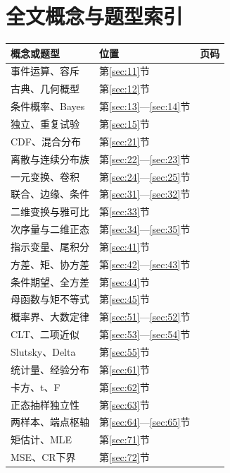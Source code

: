 \section{全文概念与题型索引}
\begin{longtable}{@{}p{}p{}p{}@{}}\toprule
概念或题型&位置&页码\\\midrule\endhead
事件运算、容斥&第\ref{sec:11}节&\pageref{sec:11}\\
古典、几何概型&第\ref{sec:12}节&\pageref{sec:12}\\
条件概率、Bayes&第\ref{sec:13}—\ref{sec:14}节&\pageref{sec:13}\\
独立、重复试验&第\ref{sec:15}节&\pageref{sec:15}\\
CDF、混合分布&第\ref{sec:21}节&\pageref{sec:21}\\
离散与连续分布族&第\ref{sec:22}—\ref{sec:23}节&\pageref{sec:22}\\
一元变换、卷积&第\ref{sec:24}—\ref{sec:25}节&\pageref{sec:24}\\
联合、边缘、条件&第\ref{sec:31}—\ref{sec:32}节&\pageref{sec:31}\\
二维变换与雅可比&第\ref{sec:33}节&\pageref{sec:33}\\
次序量与二维正态&第\ref{sec:34}—\ref{sec:35}节&\pageref{sec:34}\\
指示变量、尾积分&第\ref{sec:41}节&\pageref{sec:41}\\
方差、矩、协方差&第\ref{sec:42}—\ref{sec:43}节&\pageref{sec:42}\\
条件期望、全方差&第\ref{sec:44}节&\pageref{sec:44}\\
母函数与矩不等式&第\ref{sec:45}节&\pageref{sec:45}\\
概率界、大数定律&第\ref{sec:51}—\ref{sec:52}节&\pageref{sec:51}\\
CLT、二项近似&第\ref{sec:53}—\ref{sec:54}节&\pageref{sec:53}\\
Slutsky、Delta&第\ref{sec:55}节&\pageref{sec:55}\\
统计量、经验分布&第\ref{sec:61}节&\pageref{sec:61}\\
卡方、t、F&第\ref{sec:62}节&\pageref{sec:62}\\
正态抽样独立性&第\ref{sec:63}节&\pageref{sec:63}\\
两样本、端点枢轴&第\ref{sec:64}—\ref{sec:65}节&\pageref{sec:64}\\
矩估计、MLE&第\ref{sec:71}节&\pageref{sec:71}\\
MSE、CR下界&第\ref{sec:72}节&\pageref{sec:72}\\

\end{longtable}
